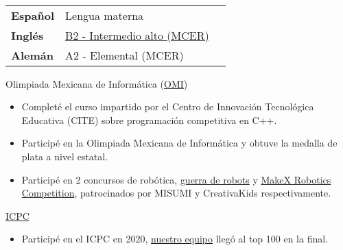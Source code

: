 \documentclass[10pt,a4paper,ragged2e,withhyper]{altacv}
\begin{document}
\begin{paracol}{2}
  \\

  \begin{tabular}{l | ll}
    \textbf{Español} & Lengua materna\\
    \textbf{Inglés} & \href{https://drive.google.com/file/d/1gBM0AOUTz7h87_4FS4IsUOT8kphNWD5m/view?usp=sharing}{\color{blue}B2 - Intermedio alto (MCER)\color{black}}\\
    \textbf{Alemán} & A2 - Elemental (MCER)
  \end{tabular}

  {Olimpiada Mexicana de Informática
  ({\href{https://www.olimpiadadeinformatica.org.mx/OMI/OMI/InfoGeneral/Que_es_la_OMI.aspx}{\color{blue}OMI\color{black}}})}
  {}{}
  \begin{itemize}
    \item Completé el curso impartido por el Centro de Innovación Tecnológica
    Educativa (CITE) sobre programación competitiva en C++.
    \item Participé en la Olimpiada Mexicana de Informática y obtuve la medalla
    de plata a nivel estatal.
  \end{itemize}
  \divider
  \begin{itemize}
    \item Participé en 2 concursos de robótica,
    {\href{https://drive.google.com/file/d/1xETjexZx_X1Bg46y_-m8kKneEbaz48dQ/view?usp=sharing}{\color{blue}
    guerra de robots\color{black}}} y
    {\href{https://drive.google.com/file/d/1QcXzJbDVQ1dSvtQrdd_j387KvKlfXH8J/view?usp=sharing}{\color{blue}
    MakeX Robotics Competition\color{black}}}, patrocinados por MISUMI y
    CreativaKids respectivamente.
  \end{itemize}
  \divider
  {{\href{https://es.wikipedia.org/wiki/Competición_Internacional_Universitaria_de_Programación}{\color{blue}ICPC\color{black}}}}
  {}{}
  \begin{itemize}
    \item Participé en el ICPC en 2020,
    {\href{https://drive.google.com/file/d/1OwYn_YItOoTw_DI-Dajlrwc_oC57Rv6G/view?usp=sharing}{\color{blue}
    nuestro equipo\color{black}}} llegó al top 100 en la final.
  \end{itemize}

  \newpage
\end{paracol}
\end{document}
